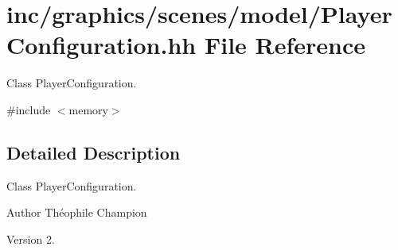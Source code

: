 \hypertarget{PlayerConfiguration_8hh}{}\section{inc/graphics/scenes/model/\+Player\+Configuration.hh File Reference}
\label{PlayerConfiguration_8hh}


Class Player\+Configuration.  


{\ttfamily \#include $<$memory$>$}\newline


\subsection{Detailed Description}
Class Player\+Configuration. 

\begin{DoxyAuthor}{Author}
Théophile Champion 
\end{DoxyAuthor}
\begin{DoxyVersion}{Version}
2. 
\end{DoxyVersion}
